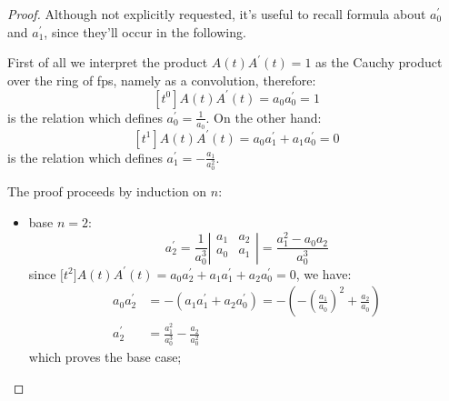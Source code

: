 \begin{proof}
Although not explicitly requested, %
it's useful to recall formula about $a_{0}^{\prime}$ and $a_{1}^{\prime}$, 
since they'll occur in the following. 

First of all we interpret the product
$A(t)A^{\prime}(t)=1$ as the Cauchy product over the ring of \ac{fps}, 
namely as a convolution, therefore: 
\begin{displaymath}
    \left[t^{0}\right]A(t)A^{\prime}(t)=a_{0}a_{0}^{\prime}=1
\end{displaymath}
is the relation which defines $a_{0}^{\prime}=\frac{1}{a_0}$.  On the other hand: 
\begin{displaymath}
    \left[t^{1}\right]A(t)A^{\prime}(t)=a_{0}a_{1}^{\prime}+a_{1}a_{0}^{\prime}=0
\end{displaymath}
is the relation which defines $a_{1}^{\prime}=-\frac{a_1}{a_{0}^{2}}$.

The proof proceeds by induction on $n$:
\begin{itemize}
    \item base $n=2$:
        \begin{displaymath}                
            a_{2}^{\prime} = \frac{1}{a_{0}^{3}}
                \left|
                \begin{array}{cc}
                    a_1 & a_2 \\
                    a_0 & a_1 \\
                \end{array}
                \right| 
                = \frac{a_{1}^{2}-a_{0}a_{2}}{a_{0}^{3}}
        \end{displaymath}                
        since $\big[t^{2}\big]A(t)A^{\prime}(t)=a_{0}a_{2}^{\prime}
            +a_{1}a_{1}^{\prime}+a_{2}a_{0}^{\prime}=0$, we have:
            \begin{displaymath}
                \begin{split}
                    a_{0}a_{2}^{\prime} &= -\left(a_{1}a_{1}^{\prime}+a_{2}a_{0}^{\prime}\right)
                        = -\left(-\left(\frac{a_{1}}{a_{0}}\right)^{2}+\frac{a_{2}}{a_{0}}\right)\\
                    a_{2}^{\prime} &= \frac{a_{1}^{2}}{a_{0}^{3}}-\frac{a_{2}}{a_{0}^{2}}
                \end{split}
            \end{displaymath}
        which proves the base case;


\end{itemize}
\end{proof}
